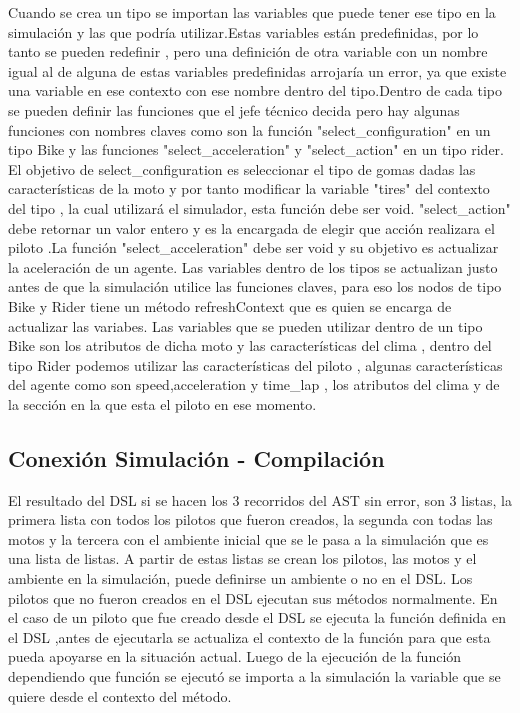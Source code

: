 \documentclass[12pt, letterpaper,spanish]{article}
\theoremstyle{definition}
\theoremstyle{remark}
\begin{document}
        Cuando se crea un tipo se importan las variables que puede tener ese tipo en la simulación y las que podría utilizar.Estas variables están predefinidas, por lo tanto
        se pueden redefinir , pero una definición de otra variable con un nombre igual al de alguna de estas variables predefinidas arrojaría un error,
        ya que existe una variable en ese contexto con ese nombre dentro del tipo.Dentro de cada tipo se pueden definir las funciones que el jefe
        técnico decida pero hay algunas funciones con nombres claves como son la función "select_configuration" en un tipo Bike y las funciones 
        "select_acceleration" y "select_action" en un tipo rider. El objetivo de select_configuration es seleccionar el tipo de gomas dadas las
        características de la moto y por tanto modificar la variable "tires" del contexto del tipo , la cual utilizará el simulador, esta función
        debe ser void. "select_action" debe retornar un valor entero y es la encargada de elegir que acción realizara el piloto .La función "select_acceleration"
        debe ser void y su objetivo es actualizar la aceleración de un agente. Las variables dentro de los tipos se actualizan justo antes de que 
        la simulación utilice las funciones claves, para eso los nodos de tipo Bike y Rider tiene un método refreshContext que es quien se encarga 
        de actualizar las variabes. Las variables que se pueden utilizar dentro de un tipo Bike son los atributos de dicha moto y las características
        del clima , dentro del tipo Rider podemos utilizar las características del piloto , algunas características del agente como son speed,acceleration
        y time_lap , los atributos del clima y de la sección en la que esta el piloto en ese momento.      


	\subsection{Conexión Simulación - Compilación}
	
	El resultado del DSL si se hacen los 3 recorridos del AST sin error, son 3 listas, la primera lista con todos los pilotos que fueron
        creados, la segunda con todas las motos y la tercera con el ambiente inicial que se le pasa a la simulación que es una lista de listas.
        A partir de estas listas se crean los pilotos, las motos y el ambiente en la simulación, puede definirse un ambiente o no en el DSL. 
        Los pilotos que no fueron creados en el DSL ejecutan sus métodos normalmente. En el caso de un piloto que fue creado desde el DSL se ejecuta
        la función definida en el DSL ,antes de ejecutarla se actualiza el contexto de la función para que esta pueda apoyarse en la situación actual.
        Luego de la ejecución de la función dependiendo que función se ejecutó se importa a la simulación la variable que se quiere desde el contexto
        del método.    
			
\end{document}
